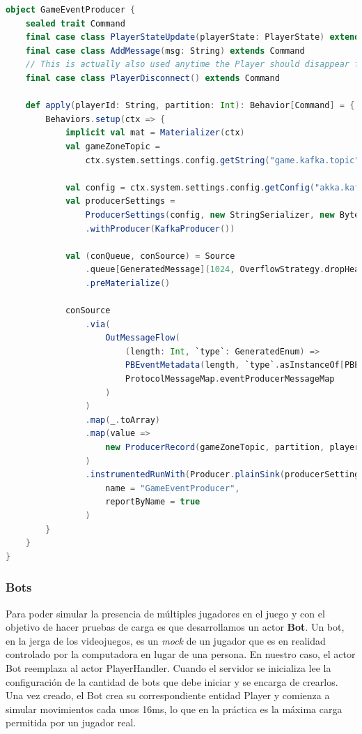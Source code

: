 \begin{lstlisting}[language=Scala, caption={\textbf{Implementación del actor GameEventProducer}}]
object GameEventProducer {
    sealed trait Command
    final case class PlayerStateUpdate(playerState: PlayerState) extends Command
    final case class AddMessage(msg: String) extends Command
    // This is actually also used anytime the Player should disappear from the map (ie. when starting a Truco match)
    final case class PlayerDisconnect() extends Command
    
    def apply(playerId: String, partition: Int): Behavior[Command] = {
        Behaviors.setup(ctx => {
            implicit val mat = Materializer(ctx)
            val gameZoneTopic =
                ctx.system.settings.config.getString("game.kafka.topic")
        
            val config = ctx.system.settings.config.getConfig("akka.kafka-producer")
            val producerSettings =
                ProducerSettings(config, new StringSerializer, new ByteArraySerializer)
                .withProducer(KafkaProducer())
        
            val (conQueue, conSource) = Source
                .queue[GeneratedMessage](1024, OverflowStrategy.dropHead)
                .preMaterialize()
        
            conSource
                .via(
                    OutMessageFlow(
                        (length: Int, `type`: GeneratedEnum) =>
                        PBEventMetadata(length, `type`.asInstanceOf[PBEventMessageType]),
                        ProtocolMessageMap.eventProducerMessageMap
                    )
                )
                .map(_.toArray)
                .map(value =>
                    new ProducerRecord(gameZoneTopic, partition, playerId, value)
                )
                .instrumentedRunWith(Producer.plainSink(producerSettings))(
                    name = "GameEventProducer",
                    reportByName = true
                )
        }
    }
}
\end{lstlisting}

\subsubsection{Bots}

\noindent Para poder simular la presencia de múltiples jugadores en el juego y con el objetivo de hacer pruebas de carga es que
desarrollamos un actor \textbf{Bot}. Un bot, en la jerga de los videojuegos, es un \textit{mock} de un jugador que es en realidad controlado
por la computadora en lugar de una persona. En nuestro caso, el actor Bot reemplaza al actor PlayerHandler. Cuando el servidor se inicializa
lee la configuración de la cantidad de bots que debe iniciar y se encarga de crearlos. Una vez creado, el Bot crea su correspondiente entidad Player
y comienza a simular movimientos cada unos 16ms, lo que en la práctica es la máxima carga permitida por un jugador real.


